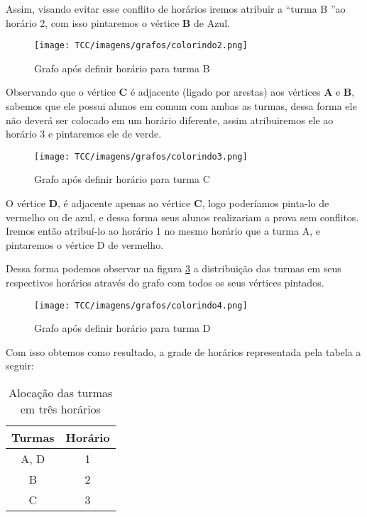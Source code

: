 Assim, visando evitar esse conflito de horários iremos atribuir a “turma B ”ao horário 2, com isso pintaremos o vértice \textbf{B} de Azul.

\begin{figure}[H]
     \centering
     \texttt{[image: TCC/imagens/grafos/colorindo2.png]}
     \caption{Grafo após definir horário para turma B}
     \label{grafo-colorido2}
\end{figure}


Observando que o vértice \textbf{C} é adjacente (ligado por arestas)
 aos vértices \textbf{A} e \textbf{B}, sabemos que ele possui alunos em comum com ambas as turmas, dessa forma ele não deverá ser colocado em um horário diferente, assim atribuiremos ele ao horário 3 e pintaremos ele de verde.

\begin{figure}[H]
     \centering
     \texttt{[image: TCC/imagens/grafos/colorindo3.png]}
     \caption{Grafo após definir horário para turma C}
     \label{grafo-colorido3}
\end{figure}


O vértice \textbf{D}, é adjacente apenas ao vértice \textbf{C}, logo poderíamos pinta-lo de vermelho ou de azul, e dessa forma seus alunos realizariam a prova sem conflitos. Iremos então atribuí-lo ao horário 1 no mesmo horário que a turma A, e pintaremos o vértice D de vermelho.

Dessa forma podemos observar na figura \ref{grafo-colorido4} a distribuição das turmas em seus respectivos horários através do grafo com todos os seus vértices pintados.

\begin{figure}[H]
     \centering
     \texttt{[image: TCC/imagens/grafos/colorindo4.png]}
     \caption{Grafo após definir horário para turma D}
     \label{grafo-colorido4}
\end{figure}

Com isso obtemos como resultado, a grade de horários representada pela tabela a seguir:

\begin{table}[H]
    \centering
    \vspace{0.5cm}
    \renewcommand\arraystretch{1.5}
    \begin{tabular}{c|c}
     
        \textbf{Turmas} & \textbf{Horário} \\ %
        \hline                               %
        	A, D & 1 \\
B  & 2 \\
C & 3
        \\
        \hline
    \end{tabular}
    \caption{Alocação das turmas em três horários}
    \label{tabela-relacao3}
\end{table}



